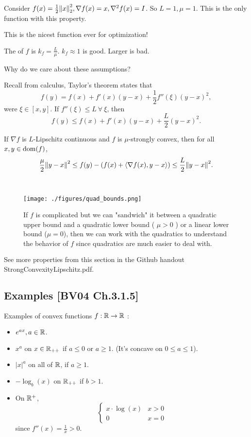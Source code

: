 \documentclass[class=article,crop=false]{standalone}
\begin{document}
\begin{eg}
	Consider $ f(x) = \frac{1}{2} {\left\lVert{ x}\right\rVert}_2^2, \nabla f(x) = x, \nabla ^2f(x) = I $. So $ L=1, \mu=1$. This is the only function with this property.
	
	This is the nicest function ever for optimization!
\end{eg}
\begin{defn}
The  of $ f$ is  $ k_f = \frac{L}{\mu}$. $ k_f \approx 1$ is good. Larger is bad.
\end{defn}
Why do we care about these assumptions?

Recall from calculus, Taylor's theorem states that
\[
	f(y) = f(x) + f'(x) (y-x) + \frac{1}{2} f''(\xi) (y-x)^2
,\] 
were $ \xi \in [x,y]$. If $ f''(\xi) \leq L \ \forall \ \xi$, then
\[
	f(y) \leq f(x) + f'(x)(y-x) + \frac{L}{2} (y-x)^2
.\] 
\begin{thm}
	If $ \nabla f$ is $L$-Lipschitz continuous and $ f$ is  $ \mu$-strongly convex, then for all $ x,y \in \operatorname{dom}(f)$,
	\[
		\frac{\mu}{2} {\left\lVert{ y-x}\right\rVert}^2 \leq f(y) - (f(x) + \langle \nabla f(x), y-x \rangle) \leq \frac{L}{2} {\left\lVert{ y-x}\right\rVert}^2 
	.\] 
\end{thm}
~\begin{figure}[H]
	\centering
	\texttt{[image: ./figures/quad\_bounds.png]}
	\caption{If $ f$ is complicated but we can "sandwich" it between a quadratic upper bound and a quadratic lower bound ( $ \mu>0$ ) or a linear lower bound ($ \mu=0$), then we can work with the quadratics to understand the behavior of $ f$ since quadratics are much easier to deal with.}
\end{figure}

See more properties from this section in the Github handout StrongConvexityLipschitz.pdf.
\newpage

\subsection{Examples [BV04 Ch.3.1.5]}
Examples of convex functions $ f: \mathbb{R} \to \mathbb{R}$ :
\begin{itemize}
	\item $ e^{ax}, a \in \mathbb{R}$.
	\item $ x^{a}$ on $ x \in \mathbb{R}_{++}$ if $ a\leq 0$ or  $ a\geq 1$. (It's concave on  $ 0\leq a \leq 1$).
	\item  $ |x|^{a}$ on all of $ \mathbb{R}$, if $ a\geq 1$.
	\item  $ - \log_b(x)$ on $ \mathbb{R}_{++}$ if $ b>1$.
	\item On $ \mathbb{R}^{+}$,
		\begin{equation*}
		\begin{cases}
			x \cdot \log(x) & x>0\\
			0 & x=0
		\end{cases}
		\end{equation*}
		since $ f''(x) = \frac{1}{x} >0$.
\end{itemize}
\end{document}
